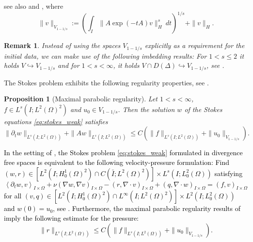 \documentclass{m2an}
\newcommand\blue[1]{\textcolor{black}{#1}}
\newtheorem{proposition}[theorem]{Proposition}
\newtheorem{remark}[theorem]{Remark}
\newcommand{\IOprod}[1]{\left( #1 \right)_{I\times\Omega}}
\newcommand{\IOpair}[1]{\left\langle #1 \right\rangle_{I\times\Omega}}
\begin{document}
see also \cite{behringer_fully_2022} and \cite[Chapter 1, Section 3.3]{ashyralyev_well_posedness_1994},
where
\begin{equation*}
  \|v\|_{V_{1-1/s}} := \left( \int_I \|A \exp(-t A) v\|_H^s \ dt \right)^{1/s} + \|v\|_H.
\end{equation*}
\begin{remark}\label{rem:initial_data_spaces}
  Instead of using the spaces $V_{1-1/s}$ explicitly as a requirement for the initial data, we can
  make use of the following imbedding results:
  For $1 < s \le 2$ it holds $V \hookrightarrow V_{1-1/s}$ and for $1 < s < \infty$,
  it holds $V \cap D(\Delta) \hookrightarrow V_{1-1/s}$, see \cite[Remarks 2.8, 2.9]{behringer_fully_2022}.
\end{remark}
The Stokes problem exhibits the following regularity properties, 
see \cite[Proposition 2.6]{behringer_fully_2022}.
\begin{proposition}[Maximal parabolic regularity]\label{prop:max_par_reg}
  Let $1 < s < \infty$, $f \in L^s(I;L^2(\Omega)^2)$ and $u_0 \in V_{1-1/s}$.
  Then the solution $w$ of the Stokes equations \eqref{eq:stokes_weak} satisfies
  \begin{equation*}
    \|\partial_t w\|_{L^s(I;L^2(\Omega))} + \|A w\|_{L^s(I;L^2(\Omega))} \le 
    C\left(\|f\|_{L^s(I;L^2(\Omega))} + \|u_0\|_{V_{1-1/s}}\right).
  \end{equation*}
\end{proposition}
\blue{In the setting of , the Stokes problem \eqref{eq:stokes_weak} formulated
  in divergence free spaces is equivalent to the following velocity-pressure formulation:
Find $(w,r) \in \left[L^2(I;H^1_0(\Omega)^2)\cap C(\bar I;L^2(\Omega)^2)\right] \times L^s(I;L^2_0(\Omega))$
satisfying
\begin{equation}\label{eq:stokes_weak_pressure}
  \IOpair{\partial_t w,v} + \nu \IOprod{\nabla w,\nabla v} - \IOprod{r,\nabla \cdot v}
  + \IOprod{q,\nabla \cdot w} = \IOprod{f,v}
\end{equation}
for all 
$(v,q) \in \left[L^2(I;H^1_0(\Omega)^2)\cap L^\infty(I;L^2(\Omega)^2)\right] \times L^2(I;L^2_0(\Omega))$ 
and $w(0) = u_0$, see \cite[Theorem 2.10]{behringer_fully_2022}.
Furthermore, the maximal parabolic regularity results of \Cref{prop:max_par_reg} imply the following 
estimate for the pressure:
\begin{equation*}
  \|r\|_{L^s(I;L^2(\Omega))} \le C \left( \|f\|_{L^s(I;L^2(\Omega))} + \|u_0\|_{V_{1-1/s}} \right).
\end{equation*}
}
\end{document}
